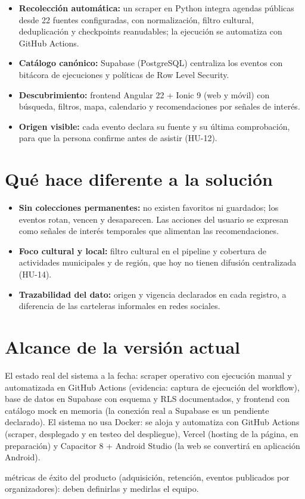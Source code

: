 \documentclass[11pt,a4paper]{article}
\begin{document}
\begin{itemize}
  \item \textbf{Recolección automática:} un scraper en Python integra agendas
        públicas desde 22 fuentes configuradas, con normalización, filtro cultural,
        deduplicación y checkpoints reanudables; la ejecución se automatiza con
        GitHub Actions.
  \item \textbf{Catálogo canónico:} Supabase (PostgreSQL) centraliza los eventos
        con bitácora de ejecuciones y políticas de Row Level Security.
  \item \textbf{Descubrimiento:} frontend Angular 22 + Ionic 9 (web y móvil) con
        búsqueda, filtros, mapa, calendario y recomendaciones por señales de
        interés.
  \item \textbf{Origen visible:} cada evento declara su fuente y su última
        comprobación, para que la persona confirme antes de asistir (HU-12).
\end{itemize}

\section{Qué hace diferente a la solución}

\begin{itemize}
  \item \textbf{Sin colecciones permanentes:} no existen favoritos ni guardados;
        los eventos rotan, vencen y desaparecen. Las acciones del usuario se
        expresan como señales de interés temporales que alimentan las
        recomendaciones.
  \item \textbf{Foco cultural y local:} filtro cultural en el pipeline y
        cobertura de actividades municipales y de región, que hoy no tienen
        difusión centralizada (HU-14).
  \item \textbf{Trazabilidad del dato:} origen y vigencia declarados en cada
        registro, a diferencia de las carteleras informales en redes sociales.
\end{itemize}

\section{Alcance de la versión actual}

El estado real del sistema a la fecha: scraper operativo con ejecución manual y
automatizada en GitHub Actions (evidencia: captura de ejecución del workflow),
base de datos en Supabase con esquema y RLS documentados, y frontend con
catálogo mock en memoria (la conexión real a Supabase es un pendiente
declarado). El sistema no usa Docker: se aloja y automatiza con GitHub Actions
(scraper, desplegado y en testeo del despliegue), Vercel (hosting de la página,
en preparación) y Capacitor 8 + Android Studio (la web se convertirá en
aplicación Android).

\begin{pendienteenv}
métricas de éxito del producto (adquisición, retención, eventos publicados por
organizadores): deben definirlas y medirlas el equipo.
\end{pendienteenv}
\end{document}

